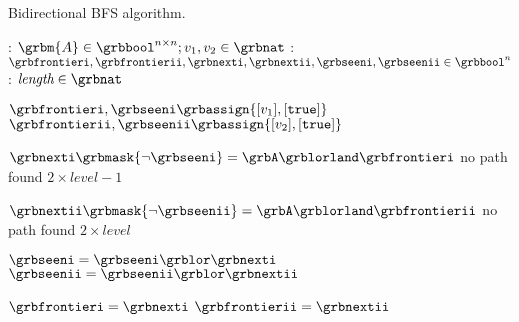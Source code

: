 \begin{algorithm}[htb]
	\footnotesize
	\caption{Bidirectional BFS algorithm.}
	\label{alg:GraphBLAS:bidirectional}
	\begin{algorithmic}[1]
		\Input:
			$\grbm{A} \in \grbbool^{n \times n}; v_1, v_2 \in \grbnat$
		\EndInput
		\Data: 
		$\grbfrontieri, \grbfrontierii,
		 \grbnexti, \grbnextii,
		 \grbseeni, \grbseenii
		 \in \grbbool^n$
		\EndData
		\Output: $\textit{length} \in \grbnat$ 
		\EndOutput

		\EndIf

		\State $\grbfrontieri,  \grbseeni  \grbassign \{ [v_1], [\texttt{true}] \}$
		\State $\grbfrontierii, \grbseenii \grbassign \{ [v_2], [\texttt{true}] \}$

			\State $\grbnexti\grbmask{\neg\grbseeni} = \grbA \grblorland \grbfrontieri$
			 \Return no path found \EndIf
			 \Return $2 \times \textit{level} - 1$ \EndIf

			\State $\grbnextii\grbmask{\neg\grbseenii} = \grbA \grblorland \grbfrontierii$
			 \Return no path found \EndIf
			 \Return $2 \times \textit{level}$ \EndIf

			\State
				$\grbseeni = \grbseeni \grblor \grbnexti$
			\State
				$\grbseenii = \grbseenii \grblor \grbnextii$
			
			\State $\grbfrontieri = \grbnexti$
			\State $\grbfrontierii = \grbnextii$
		\EndFor
		\EndProcedure
		\end{algorithmic}
\end{algorithm}

